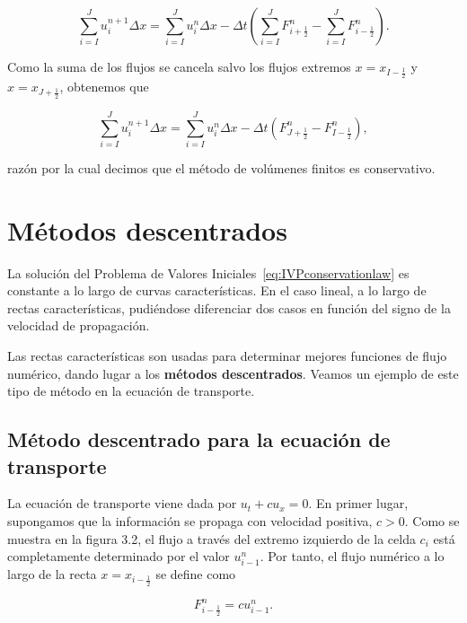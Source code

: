 \begin{equation*}
  \sum_{i=I}^{J}
  u^{n+1}_{i}
  \Delta x=
  \sum_{i=I}^{J}
  u^{n}_{i}
  \Delta x-
  \Delta t
  \left(
  \sum_{i=I}^{J}
  F^{n}_{i+\frac{1}{2}}-
  \sum_{i=I}^{J}
  F^{n}_{i-\frac{1}{2}}
  \right).
\end{equation*}

Como la suma de los flujos se cancela salvo los flujos extremos
$x=x_{I-\frac{1}{2}}$ y $x=x_{J+\frac{1}{2}}$, obtenemos que

\begin{equation}\label{eq:conservative}
  \sum_{i=I}^{J}
  u^{n+1}_{i}
  \Delta x=
  \sum_{i=I}^{J}
  u^{n}_{i}
  \Delta x-
  \Delta t
  \left(
  F^{n}_{J+\frac{1}{2}}-
  F^{n}_{I-\frac{1}{2}}
  \right),
\end{equation}

razón por la cual decimos que el método de volúmenes finitos es
conservativo.

\section{Métodos descentrados}

La solución del Problema de Valores
Iniciales~\eqref{eq:IVPconservationlaw} es constante a lo largo de
curvas características.
En el caso lineal, a lo largo de rectas características, pudiéndose
diferenciar dos casos en función del signo de la velocidad de
propagación. %


Las rectas características son usadas para determinar mejores
funciones de flujo numérico, dando lugar a los
\textbf{métodos descentrados}.
Veamos un ejemplo de este tipo de método en la ecuación de
transporte.

\subsection*{Método descentrado para la ecuación de transporte}

La ecuación de transporte viene dada por $u_{t}+cu_{x}=0$.
En primer lugar, supongamos que la información se propaga con
velocidad positiva, $c>0$.
Como se muestra en la figura 3.2, el flujo a través del extremo
izquierdo de la celda $c_{i}$ está completamente determinado por el
valor $u^{n}_{i-1}$.
Por tanto, el flujo numérico a lo largo de la recta
$x=x_{i-\frac{1}{2}}$ se define como

\begin{equation*}
  F^{n}_{i-\frac{1}{2}}=
  cu^{n}_{i-1}.
\end{equation*}

